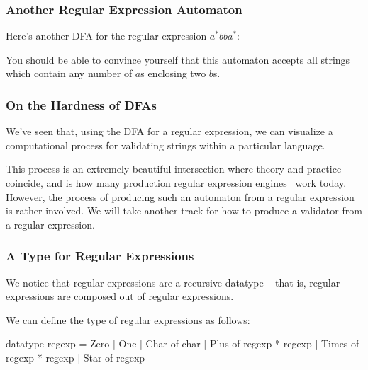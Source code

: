 \documentclass[aspectratio=169]{beamer}
\begin{document}
\begin{frame}[fragile]
  \frametitle{Another Regular Expression Automaton}

  Here's another DFA for the regular expression $a^*bba^*$:

  \vspace{\fill}


  \pause
  \vspace{\fill}

  You should be able to convince yourself that this automaton accepts
  all strings which contain any number of $a$s enclosing two $b$s.
\end{frame}



\begin{frame}[fragile]
  \frametitle{On the Hardness of DFAs}

  We've seen that, using the DFA for a regular expression, we can
  visualize a computational process for validating strings within a
  particular language.

  \pause
  \vspace{\fill}

  This process is an extremely beautiful intersection where theory and
  practice coincide, and is how many production regular expression engines\footnotemark
  \, work today. However, the process of producing such an automaton from
  a regular expression is rather involved. We will take another track
  for how to produce a validator from a regular expression.

\end{frame}

\begin{frame}[fragile]
  \frametitle{A Type for Regular Expressions}

  \tgs

  We notice that regular expressions are a recursive datatype -- that is,
  regular expressions are composed out of regular expressions.

  \vspace{\fill}

  We can define the type of regular expressions as follows:

  \begin{codeblock}
    datatype regexp =
        Zero
      | One
      | Char of char
      | Plus of regexp * regexp
      | Times of regexp * regexp
      | Star of regexp
  \end{codeblock}
\end{frame}
\end{document}
